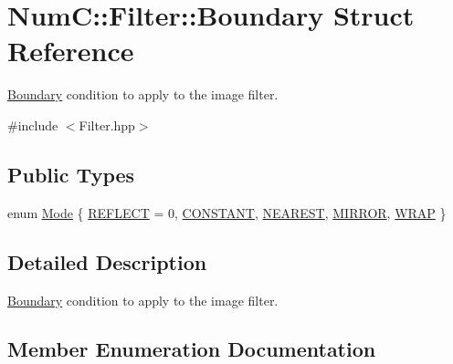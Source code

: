 \hypertarget{struct_num_c_1_1_filter_1_1_boundary}{}\section{NumC\+:\+:Filter\+:\+:Boundary Struct Reference}
\label{struct_num_c_1_1_filter_1_1_boundary}


\mbox{\hyperlink{struct_num_c_1_1_filter_1_1_boundary}{Boundary}} condition to apply to the image filter.  




{\ttfamily \#include $<$Filter.\+hpp$>$}

\subsection*{Public Types}
\begin{DoxyCompactItemize}
\item 
enum \mbox{\hyperlink{struct_num_c_1_1_filter_1_1_boundary_a20ccfbf059139a99eda623c1550a27e3}{Mode}} \{ \newline
\mbox{\hyperlink{struct_num_c_1_1_filter_1_1_boundary_a20ccfbf059139a99eda623c1550a27e3a5571d98046aa858b5c79dce8c4c16c04}{R\+E\+F\+L\+E\+CT}} = 0, 
\mbox{\hyperlink{struct_num_c_1_1_filter_1_1_boundary_a20ccfbf059139a99eda623c1550a27e3abaa37b63b6ef22a91ab6f677948faf29}{C\+O\+N\+S\+T\+A\+NT}}, 
\mbox{\hyperlink{struct_num_c_1_1_filter_1_1_boundary_a20ccfbf059139a99eda623c1550a27e3ad1f9e362171b0c789acf9268055fa060}{N\+E\+A\+R\+E\+ST}}, 
\mbox{\hyperlink{struct_num_c_1_1_filter_1_1_boundary_a20ccfbf059139a99eda623c1550a27e3aaed89a5921765811b5f9b587790d5c17}{M\+I\+R\+R\+OR}}, 
\newline
\mbox{\hyperlink{struct_num_c_1_1_filter_1_1_boundary_a20ccfbf059139a99eda623c1550a27e3aadb5556dd62e6ac40b2fd9c508476e83}{W\+R\+AP}}
 \}
\end{DoxyCompactItemize}


\subsection{Detailed Description}
\mbox{\hyperlink{struct_num_c_1_1_filter_1_1_boundary}{Boundary}} condition to apply to the image filter. 

\subsection{Member Enumeration Documentation}
\mbox{\label{struct_num_c_1_1_filter_1_1_boundary_a20ccfbf059139a99eda623c1550a27e3}} 
